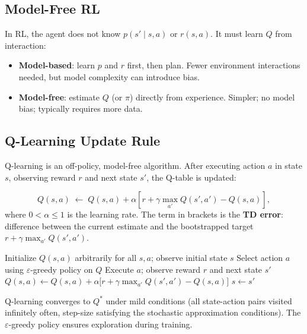 \documentclass[11pt,a4paper]{article}
\theoremstyle{definition}
\theoremstyle{plain}
\theoremstyle{remark}
\begin{document}
\subsection{Model-Free RL}

In RL, the agent does not know $p(s' \mid s, a)$ or $r(s, a)$. It must learn $Q$ from interaction:
\begin{itemize}
    \item \textbf{Model-based}: learn $p$ and $r$ first, then plan. Fewer environment interactions needed, but model complexity can introduce bias.
    \item \textbf{Model-free}: estimate $Q$ (or $\pi$) directly from experience. Simpler; no model bias; typically requires more data.
\end{itemize}

\subsection{Q-Learning Update Rule}

Q-learning is an off-policy, model-free algorithm. After executing action $a$ in state $s$, observing reward $r$ and next state $s'$, the Q-table is updated:

\begin{tcolorbox}[colback=blue!5!white,colframe=blue!75!black,title=\textbf{Tabular Q-Learning Update}]
\[
    Q(s, a) \;\leftarrow\; Q(s, a) + \alpha\!\left[r + \gamma \max_{a'} Q(s', a') - Q(s, a)\right],
\]
where $0 < \alpha \le 1$ is the learning rate. The term in brackets is the \textbf{TD error}: difference between the current estimate and the bootstrapped target $r + \gamma \max_{a'} Q(s', a')$.
\end{tcolorbox}

\begin{algorithm}
\caption{Tabular Q-Learning}
\begin{algorithmic}
\STATE Initialize $Q(s, a)$ arbitrarily for all $s, a$; observe initial state $s$
\LOOP
    \STATE Select action $a$ using $\varepsilon$-greedy policy on $Q$
    \STATE Execute $a$; observe reward $r$ and next state $s'$
    \STATE $Q(s, a) \leftarrow Q(s, a) + \alpha\bigl[r + \gamma \max_{a'} Q(s', a') - Q(s, a)\bigr]$
    \STATE $s \leftarrow s'$
\ENDLOOP
\end{algorithmic}
\end{algorithm}

Q-learning converges to $Q^*$ under mild conditions (all state-action pairs visited infinitely often, step-size satisfying the stochastic approximation conditions). The $\varepsilon$-greedy policy ensures exploration during training.
\end{document}
